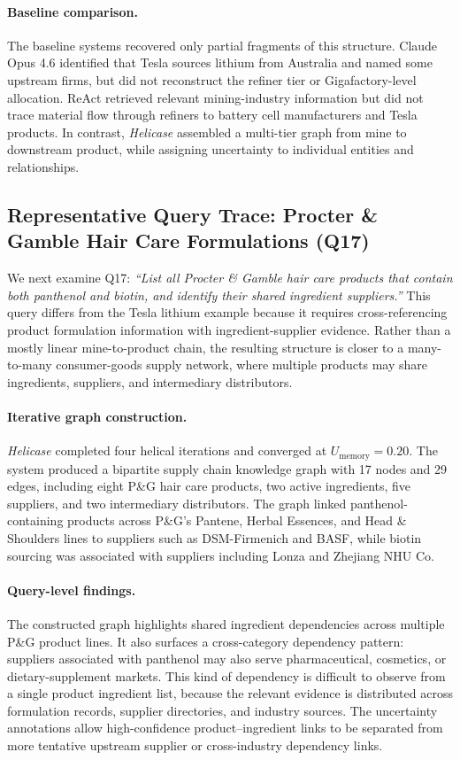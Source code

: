 \documentclass{article}
\begin{document}
\paragraph{Baseline comparison.}
The baseline systems recovered only partial fragments of this structure. Claude Opus 4.6 identified that Tesla sources lithium from Australia and named some upstream firms, but did not reconstruct the refiner tier or Gigafactory-level allocation. ReAct retrieved relevant mining-industry information but did not trace material flow through refiners to battery cell manufacturers and Tesla products. In contrast, \textit{Helicase} assembled a multi-tier graph from mine to downstream product, while assigning uncertainty to individual entities and relationships.

\subsection{Representative Query Trace: Procter \& Gamble Hair Care Formulations (Q17)}

We next examine Q17: \textit{``List all Procter \& Gamble hair care products that contain both panthenol and biotin, and identify their shared ingredient suppliers.''} This query differs from the Tesla lithium example because it requires cross-referencing product formulation information with ingredient-supplier evidence. Rather than a mostly linear mine-to-product chain, the resulting structure is closer to a many-to-many consumer-goods supply network, where multiple products may share ingredients, suppliers, and intermediary distributors.

\paragraph{Iterative graph construction.}
\textit{Helicase} completed four helical iterations and converged at $U_{\text{memory}} = 0.20$. The system produced a bipartite supply chain knowledge graph with 17 nodes and 29 edges, including eight P\&G hair care products, two active ingredients, five suppliers, and two intermediary distributors. The graph linked panthenol-containing products across P\&G's Pantene, Herbal Essences, and Head \& Shoulders lines to suppliers such as DSM-Firmenich and BASF, while biotin sourcing was associated with suppliers including Lonza and Zhejiang NHU Co.

\paragraph{Query-level findings.}
The constructed graph highlights shared ingredient dependencies across multiple P\&G product lines. It also surfaces a cross-category dependency pattern: suppliers associated with panthenol may also serve pharmaceutical, cosmetics, or dietary-supplement markets. This kind of dependency is difficult to observe from a single product ingredient list, because the relevant evidence is distributed across formulation records, supplier directories, and industry sources. The uncertainty annotations allow high-confidence product--ingredient links to be separated from more tentative upstream supplier or cross-industry dependency links.
\end{document}
